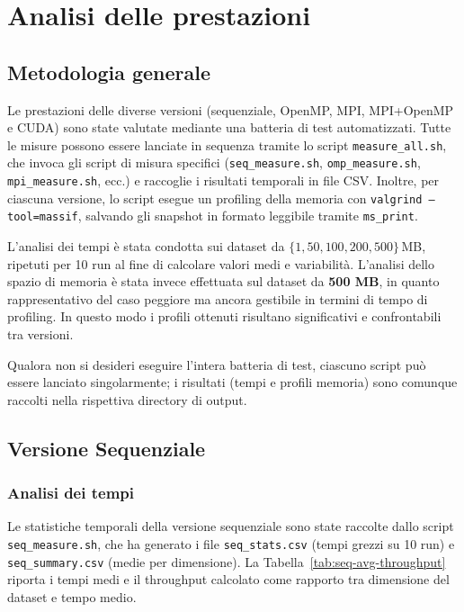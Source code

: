 \chapter{Analisi delle prestazioni}
	
	\section*{Metodologia generale}
		Le prestazioni delle diverse versioni (sequenziale, OpenMP, MPI, MPI+OpenMP e CUDA) sono state valutate mediante una batteria di test automatizzati.
		Tutte le misure possono essere lanciate in sequenza tramite lo script \texttt{measure\_all.sh}, che invoca gli script di misura specifici (\texttt{seq\_measure.sh}, \texttt{omp\_measure.sh}, \texttt{mpi\_measure.sh}, ecc.) e raccoglie i risultati temporali in file CSV\@.
		Inoltre, per ciascuna versione, lo script esegue un profiling della memoria con \texttt{valgrind --tool=massif}, salvando gli snapshot in formato leggibile tramite \texttt{ms\_print}.
		
		L’analisi dei tempi è stata condotta sui dataset da \(\{1, 50, 100, 200, 500\}\,\)MB, ripetuti per 10 run al fine di calcolare valori medi e variabilità.
		L’analisi dello spazio di memoria è stata invece effettuata sul dataset da \textbf{500 MB}, in quanto rappresentativo del caso peggiore ma ancora gestibile in termini di tempo di profiling.
		In questo modo i profili ottenuti risultano significativi e confrontabili tra versioni.
		
		Qualora non si desideri eseguire l’intera batteria di test, ciascuno script può essere lanciato singolarmente; i risultati (tempi e profili memoria) sono comunque raccolti nella rispettiva directory di output.
	
	\section{Versione Sequenziale}
		
		\subsection{Analisi dei tempi}
			Le statistiche temporali della versione sequenziale sono state raccolte dallo script \texttt{seq\_measure.sh}, che ha generato i file \texttt{seq\_stats.csv} (tempi grezzi su 10 run) e \texttt{seq\_summary.csv} (medie per dimensione).
			La Tabella~\ref{tab:seq-avg-throughput} riporta i tempi medi e il throughput calcolato come rapporto tra dimensione del dataset e tempo medio.
			
